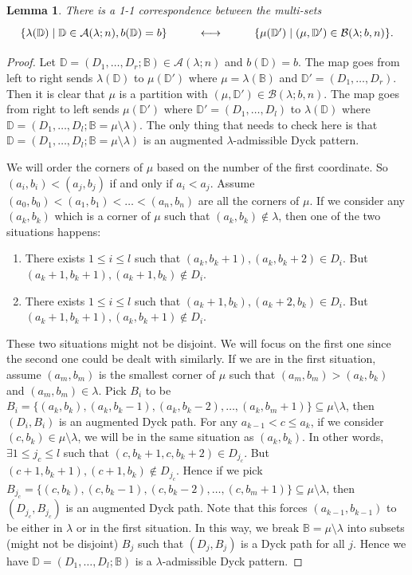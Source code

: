 \documentclass[12pt]{amsart}
\newtheorem{lem}[thm]{Lemma}
\theoremstyle{definition}
\theoremstyle{remark}
\newcommand{\cA}{\mathcal{A}}
\newcommand{\bbB}{\mathbb{B}}
\newcommand{\cB}{\mathcal{B}}
\newcommand{\bbD}{\mathbb{D}}
\numberwithin{equation}{section}
\begin{document}
\begin{lem} \label{lem:1-1}
There is a 1-1 correspondence between the multi-sets
\begin{align}
\xymatrix{
    \{ \lambda(\bbD) \mid \bbD \in \cA(\lambda;n), b(\bbD) = b \} &  \longleftrightarrow & \{ \mu(\bbD') \mid (\mu,\bbD') \in \cB(\lambda;b,n)  \}.
}
\end{align}
\end{lem}

\begin{proof}
Let $\bbD = (D_1,\ldots,D_r;\bbB) \in \cA(\lambda;n)$ and $b(\bbD) = b$. The map goes from left to right sends $\lambda(\bbD)$ to $\mu(\bbD')$ where $\mu = \lambda(\bbB)$ and $\bbD' = (D_1,\ldots,D_r)$. Then it is clear that $\mu$ is a partition with $(\mu,\bbD') \in \cB(\lambda;b,n)$. The map goes from right to left sends $\mu(\bbD')$ where $\bbD' = (D_1,\ldots,D_l)$ to $\lambda(\bbD)$ where $\bbD = (D_1,\ldots,D_l;\bbB = \mu \setminus \lambda)$. The only thing that needs to check here is that $\bbD = (D_1,\ldots,D_l;\bbB = \mu \setminus \lambda)$ is an augmented $\lambda$-admissible Dyck pattern. 

We will order the corners of $\mu$ based on the number of the first coordinate. So $(a_i,b_i) < (a_j,b_j)$ if and only if $a_i < a_j$. Assume $(a_0,b_0) < (a_1,b_1) < \ldots < (a_n,b_n)$ are all the corners of $\mu$. If we consider any $(a_k,b_k)$ which is a corner of $\mu$ such that $(a_k,b_k) \notin \lambda$, then one of the two situations happens:
\begin{enumerate} \label{situations}
    \item There exists $1 \leq i \leq l$ such that $(a_k,b_k+1),(a_k,b_k+2) \in D_i$. But $(a_k+1,b_k+1),(a_k+1,b_k) \notin D_i$.
    \item There exists $1 \leq i \leq l$ such that $(a_k + 1,b_k),(a_k+2,b_k) \in D_i$. But $(a_k+1,b_k+1),(a_k,b_k+1) \notin D_i$.
\end{enumerate}
These two situations might not be disjoint. We will focus on the first one since the second one could be dealt with similarly. If we are in the first situation, assume $(a_m,b_m)$ is the smallest corner of $\mu$ such that $(a_m,b_m) > (a_k,b_k)$ and $(a_m,b_m) \in \lambda$. Pick $B_i$ to be $B_i = \{ (a_k,b_k),(a_k,b_k-1),(a_k,b_k-2),\ldots,(a_k,b_m+1) \} \subseteq \mu \setminus \lambda$, then $(D_i,B_i)$ is an augmented Dyck path. For any $a_{k-1} < c \leq a_k$, if we consider $(c,b_k) \in \mu \setminus \lambda$, we will be in the same situation as $(a_k,b_k)$. In other words, $\exists 1 \leq j_c \leq l$ such that $(c,b_k+1,c,b_k+2) \in D_{j_c}$. But $(c+1,b_k+1),(c+1,b_k) \notin D_{j_c}$. Hence if we pick $B_{j_c} = \{ (c,b_k),(c,b_k-1),(c,b_k-2),\ldots,(c,b_m+1) \} \subseteq \mu \setminus \lambda$, then $(D_{j_c},B_{j_c})$ is an augmented Dyck path. Note that this forces $(a_{k-1},b_{k-1})$ to be either in $\lambda$ or in the first situation. In this way, we break $\bbB = \mu \setminus \lambda$ into subsets (might not be disjoint) $B_j$ such that $(D_j,B_j)$ is a Dyck path for all $j$. Hence we have $\bbD = (D_1,\ldots,D_l;\bbB)$ is a $\lambda$-admissible Dyck pattern.
\end{proof}
\end{document}
